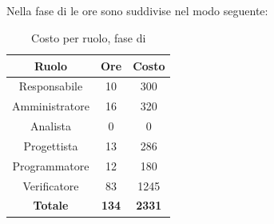 \subsection{\VV}
Nella fase di \VV le ore sono suddivise nel modo seguente:
\begin{table}[H]
	\centering
	\begin{tabular}{|c|c|c|}
		\hline
		\textbf{Ruolo} &
		\textbf{Ore} &
		\textbf{Costo} \\
		\hline
		Responsabile & 10 & 300\\
		\hline
		Amministratore & 16 & 320\\
		\hline
		Analista & 0 & 0\\
		\hline
		Progettista & 13 & 286 \\
		\hline
		Programmatore & 12 & 180 \\
		\hline
		Verificatore & 83 & 1245\\
		\hline
		\textbf{Totale} & \textbf{134} & \textbf{2331} \\
		\hline
	\end{tabular}
	\caption{Costo per ruolo, fase di \VV}
\end{table}


